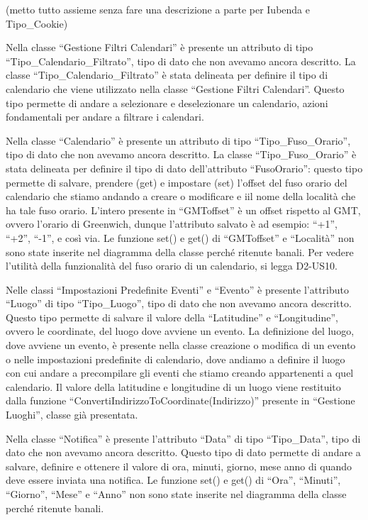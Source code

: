 \begin{listaPersonale}[DCL]{}
    (metto tutto assieme senza fare una descrizione a parte per Iubenda e Tipo\_Cookie)


    Nella classe “Gestione Filtri Calendari” è presente un attributo di tipo “Tipo\_Calendario\_Filtrato”, tipo di dato che non avevamo ancora descritto. La classe “Tipo\_Calendario\_Filtrato” è stata delineata per definire il tipo di calendario che viene utilizzato nella classe “Gestione Filtri Calendari”. Questo tipo permette di andare a selezionare e deselezionare un calendario, azioni fondamentali per andare a filtrare i calendari.




    Nella classe “Calendario” è presente un attributo di tipo “Tipo\_Fuso\_Orario”, tipo di dato che non avevamo ancora descritto. La classe “Tipo\_Fuso\_Orario” è stata delineata per definire il tipo di dato dell'attributo “FusoOrario”: questo tipo permette di salvare, prendere (get) e impostare (set) l'offset del fuso orario del calendario che stiamo andando a creare o modificare e iil nome della località che ha tale fuso orario. L'intero presente in “GMToffset” è un offset rispetto al GMT, ovvero l'orario di Greenwich, dunque l'attributo salvato è ad esempio: “+1”, “+2”, “-1”, e così via. Le funzione set() e get() di “GMToffset” e “Località” non sono state inserite nel diagramma della classe perché ritenute banali. Per vedere l'utilità della funzionalità del fuso orario di un calendario, si legga D2-US10.


    Nelle classi “Impostazioni Predefinite Eventi” e “Evento” è presente l'attributo “Luogo” di tipo “Tipo\_Luogo”, tipo di dato che non avevamo ancora descritto. Questo tipo permette di salvare il valore della “Latitudine” e “Longitudine”, ovvero le coordinate, del luogo dove avviene un evento. La definizione del luogo, dove avviene un evento, è presente nella classe creazione o modifica di un evento o nelle impostazioni predefinite di calendario, dove andiamo a definire il luogo con cui andare a precompilare gli eventi che stiamo creando appartenenti a quel calendario. Il valore della latitudine e longitudine di un luogo viene restituito dalla funzione “ConvertiIndirizzoToCoordinate(Indirizzo)” presente in “Gestione Luoghi”, classe già presentata.


    Nella classe “Notifica” è presente l'attributo “Data” di tipo “Tipo\_Data”, tipo di dato che non avevamo ancora descritto. Questo tipo di dato permette di andare a salvare, definire e ottenere il valore di ora, minuti, giorno, mese anno di quando deve essere inviata una notifica. Le funzione set() e get() di “Ora”, “Minuti”, “Giorno”, “Mese” e “Anno” non sono state inserite nel diagramma della classe perché ritenute banali.


\end{listaPersonale}
